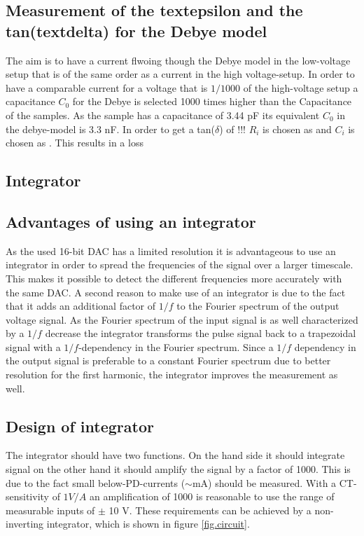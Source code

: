 \subsection{Measurement of the textepsilon and the tan(textdelta) for the Debye model}

The aim is to have a current flwoing though the Debye model in the low-voltage setup that is of the same order as a current in the high voltage-setup. In order to have a comparable current for a voltage that is $1/1000$ of the high-voltage setup a capacitance $C_0$ for the Debye is selected 1000 times higher than the Capacitance of the samples. As the sample has a capacitance of 3.44 pF its equivalent $C_0$ in the debye-model is 3.3 nF. In order to get a tan($\delta$) of !!! $R_i$ is chosen as and $C_i$ is chosen as . This results in a loss 



\subsection{Integrator}
\subsection{Advantages of using an integrator}
As the used 16-bit DAC has a limited resolution it is advantageous to use an integrator in order to spread the frequencies of the signal over a larger timescale. This makes it possible to detect the different frequencies more accurately with the same DAC. 
A second reason to make use of an integrator is due to the fact that it adds an additional factor of $1/f$ to the Fourier spectrum of the output voltage signal. As the Fourier spectrum of the input signal is as well characterized by a $1/f$ decrease the integrator transforms the pulse signal back to a trapezoidal signal with a $1/f$-dependency in the Fourier spectrum. Since a $1/f$ dependency in the output signal is preferable to a constant Fourier spectrum due to better resolution for the first harmonic, the integrator improves the measurement as well. 

\subsection{Design of integrator}
The integrator should have two functions. On the hand side it should integrate signal on the other hand it should amplify the signal by a factor of 1000. This is due to the fact small below-PD-currents ($\sim$mA) should be measured. With a CT-sensitivity of $1V/A$ an amplification of 1000 is reasonable to use the range of measurable inputs of $\pm$ 10 V. These requirements can be achieved by a non-inverting integrator, which is shown in figure  \ref{fig.circuit}. 

